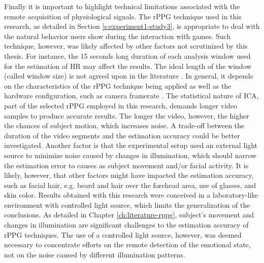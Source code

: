 Finally it is important to highlight technical limitations associated with the remote acquisition of physiological signals. The rPPG technique used in this research, as detailed in Section \ref{s:experiment1-study3}, is appropriate to deal with the natural behavior users show during the interaction with games. Such technique, however, was likely affected by other factors not scrutinized by this thesis. For instance, the 15 seconds long duration of each analysis window used for the estimation of HR may affect the results. The ideal length of the window (called window size) is not agreed upon in the literature \parencite{rouast2016remote}. In general, it depends on the characteristics of the rPPG technique being applied as well as the hardware configuration, such as camera framerate \parencite{roald2013estimation}. The statistical nature of ICA, part of the selected rPPG employed in this research, demands longer video samples to produce accurate results. The longer the video, however, the higher the chances of subject motion, which increases noise. A trade-off between the duration of the video segments and the estimation accuracy could be better investigated. Another factor is that the experimental setup used an external light source to minimize noise caused by changes in illumination, which should narrow the estimation error to causes as subject movement and/or facial activity. It is likely, however, that other factors might have impacted the estimation accuracy, such as facial hair, e.g. beard and hair over the forehead area, use of glasses, and skin color. Results obtained with this research were conceived in a laboratory-like environment with controlled light source, which limits the generalization of the conclusions. As detailed in Chapter \ref{ch:literature-rppg}, subject's movement and changes in illumination are significant challenges to the estimation accuracy of rPPG techniques. The use of a controlled light source, however, was deemed necessary to concentrate efforts on the remote detection of the emotional state, not on the noise caused by different illumination patterns.


